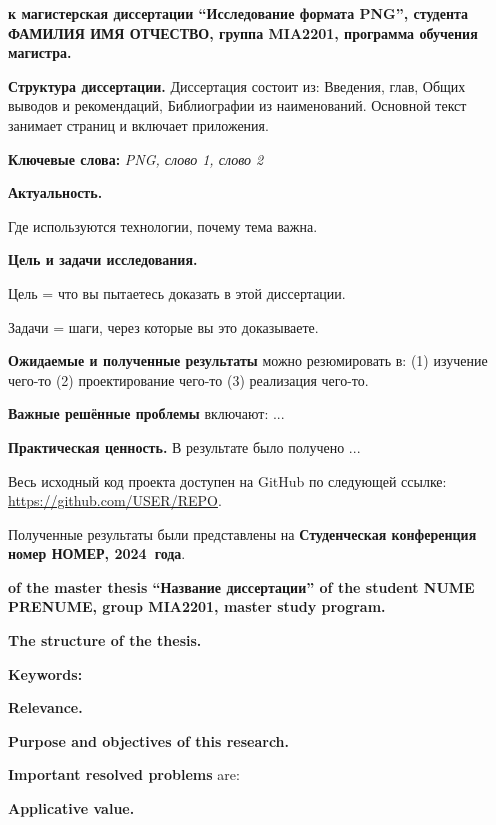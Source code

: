 \documentclass[a4paper,12pt]{report}
\newcommand{\thesisTitleEng}{Название диссертации} %
\newcommand{\uniGroupName}{MIA2201}
\newcommand{\authorName}{NUME PRENUME} %
\newcommand{\thesisType}{master} %
\newcommand{\programulDeStudii}{master} %
\newcommand{\authorNameRu}{ФАМИЛИЯ ИМЯ ОТЧЕСТВО}
\newcommand{\thesisTitleRu}{Исследование формата PNG}
\newcommand{\thesisTypeRu}{магистерская} %
\newcommand{\programulDeStudiiRu}{магистра} %
\newcommand{\conferencesList}{Студенческая конференция номер НОМЕР, \year~года}
\renewcommand{\year}{2024}
\newcommand{\github}{\url{https://github.com/USER/REPO}}
\begin{document}
\titlePage

\clearpage
\tableofcontents

\clearpage
{} %

\textbf{к \thesisTypeRu{} диссертации ``\thesisTitleRu{}'', студента \authorNameRu{}, группа \uniGroupName{}, программа обучения \programulDeStudiiRu.}

\textbf{Структура диссертации.}
Диссертация состоит из: Введения, \chapterCount{} глав, Общих выводов и рекомендаций, Библиографии из \bibliographyEntryCount{} наименований.
Основной текст занимает \usefulPageCount{} страниц и включает \anexeCount{} приложения.

\textbf{Ключевые слова:}
\textit{\acs{PNG}, слово 1, слово 2}

\textbf{Актуальность.}

Где используются технологии, почему тема важна.

\textbf{Цель и задачи исследования.}

Цель = что вы пытаетесь доказать в этой диссертации.

Задачи = шаги, через которые вы это доказываете.

\textbf{Ожидаемые и полученные результаты} можно резюмировать в:
(1) изучение чего-то
(2) проектирование чего-то
(3) реализация чего-то.

\textbf{Важные решённые проблемы} включают: ...

\textbf{Практическая ценность.} В результате было получено ...

Весь исходный код проекта доступен на GitHub по следующей ссылке: \github.

Полученные результаты были представлены на \textbf{\conferencesList}\cite{self}.

\clearpage
{} %

\textbf{of the \thesisType{} thesis ``\thesisTitleEng'' of the student \authorName{}, group \uniGroupName{}, \programulDeStudii{} study program.}

\textbf{The structure of the thesis.}

\textbf{Keywords:}
\textit{}

\textbf{Relevance.}

\textbf{Purpose and objectives of this research.}

\textbf{Important resolved problems} are:

\textbf{Applicative value.} 
\end{document}
